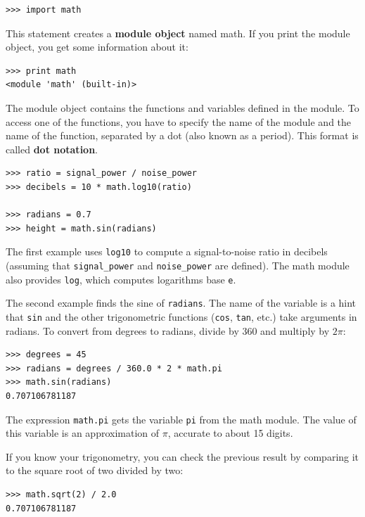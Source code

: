 \documentclass[10pt]{book}
\begin{document}
\begin{verbatim}
>>> import math
\end{verbatim}
%
This statement creates a {\bf module object} named math.  If
you print the module object, you get some information about it:

\begin{verbatim}
>>> print math
<module 'math' (built-in)>
\end{verbatim}
%
The module object contains the functions and variables defined in the
module.  To access one of the functions, you have to specify the name
of the module and the name of the function, separated by a dot (also
known as a period).  This format is called {\bf dot notation}.

\begin{verbatim}
>>> ratio = signal_power / noise_power
>>> decibels = 10 * math.log10(ratio)

>>> radians = 0.7
>>> height = math.sin(radians)
\end{verbatim}
%
The first example uses \verb"log10" to compute 
a signal-to-noise ratio in decibels (assuming that \verb"signal_power" and
\verb"noise_power" are defined).  The math module also provides {\tt log},
which computes logarithms base {\tt e}.

The second example finds the sine of {\tt radians}.  The name of the
variable is a hint that {\tt sin} and the other trigonometric
functions ({\tt cos}, {\tt tan}, etc.)  take arguments in radians. To
convert from degrees to radians, divide by 360 and multiply by
$2 \pi$:

\begin{verbatim}
>>> degrees = 45
>>> radians = degrees / 360.0 * 2 * math.pi
>>> math.sin(radians)
0.707106781187
\end{verbatim}
%
The expression {\tt math.pi} gets the variable {\tt pi} from the math
module.  The value of this variable is an approximation
of $\pi$, accurate to about 15 digits.

If you know
your trigonometry, you can check the previous result by comparing it to
the square root of two divided by two:

\begin{verbatim}
>>> math.sqrt(2) / 2.0
0.707106781187
\end{verbatim}
%
\end{document}
